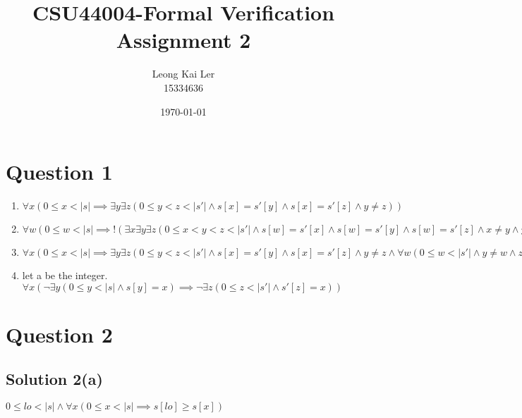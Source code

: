 \documentclass[12pt]{article}
\makeatletter
\newcommand\abs[1]{\left|#1\right|}
\renewcommand{\maketitle}{\bgroup\setlength{\parindent}{0pt}
\begin{flushleft}
  \textbf{\@title}

  \@author
  \@date
\end{flushleft}\egroup
}
\makeatother
\begin{document}
\title{CSU44004-Formal Verification Assignment 2 }
\author{Leong Kai Ler \\ 15334636 \\   }
\date{\today}
\maketitle

\section*{Question 1}
\begin{enumerate}[label=\alph*)]
\item $\forall x(0 \leq x < \abs{s} \implies \exists y \exists z(0 \leq y < z < \abs{s'} \land s[x] = s'[y] \land s[x] = s'[z] \land y \neq z))$ \\
\item $\forall w(0 \leq w < \abs{s} \implies !(\exists x \exists y \exists z(0 \leq x < y < z < \abs{s'} \land s[w] = s'[x] \land s[w] = s'[y] \land s[w] = s'[z] \land x \neq y \land y \neq z \land x \neq z)))$ \\
\item $\forall x(0 \leq x < \abs{s} \implies \exists y \exists z(0 \leq y < z < \abs{s'} \land s[x] = s'[y] \land s[x] = s'[z] \land y \neq z \land \forall w(0 \leq w < \abs{s'} \land y \neq w \land z \neq w \implies s[x] \neq s'[w])))$ \\
\item let a be the integer. \\
$\forall x(\neg \exists y(0 \leq y < \abs{s} \land s[y]=x) \implies \neg \exists z(0 \leq z < \abs{s'} \land s'[z]=x))$
\end{enumerate}
\newpage
\section*{Question 2} 
\subsection*{Solution 2(a)}
$0 \leq lo < \abs{s} \land \forall x (0 \leq x < \abs{s} \implies s[lo] \geq s[x])$
\end{document}
